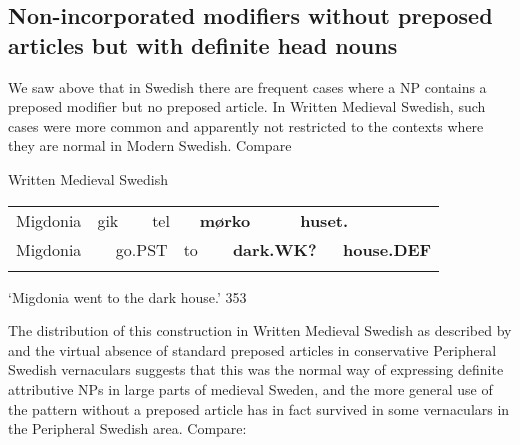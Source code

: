 \subsection{\rmfamily Non-incorporated modifiers without preposed articles but with definite head nouns}
\label{bkm:Ref154984033}
\begin{styleBodyTextFirst}
We saw above that in Swedish there are frequent cases where a NP contains a preposed modifier but no preposed article. In Written Medieval Swedish, such cases were more common and apparently not restricted to the contexts where they are normal in Modern Swedish. Compare 

\end{styleBodyTextFirst}

\begin{listWWNumileveli}
\item 

\begin{styleExample}
Written Medieval Swedish

\end{styleExample}

\end{listWWNumileveli}

\begin{tabular}{llllllllll}
\lsptoprule
Migdonia & \multicolumn{2}{l}{gik

} & \multicolumn{2}{l}{tel

} & \multicolumn{2}{l}{{\bfseries mørko}

} & \multicolumn{2}{l}{{\bfseries huset.}

} & \\
\multicolumn{2}{l}{Migdonia

} & \multicolumn{2}{l}{go.PST

} & \multicolumn{2}{l}{to

} & \multicolumn{2}{l}{{\bfseries dark.WK?}

} & \multicolumn{2}{l}{{\bfseries house.DEF}

}\\
\lspbottomrule
\end{tabular}

\begin{styleTranslation}
‘Migdonia went to the dark house.’ 353

\end{styleTranslation}

\begin{styleBodyTextFirst}
The distribution of this construction in Written Medieval Swedish as described by \citet{Larm1936} and the virtual absence of standard preposed articles in conservative Peripheral Swedish vernaculars suggests that this was the normal way of expressing definite attributive NPs in large parts of medieval Sweden, and the more general use of the pattern without a preposed article has in fact survived in some vernaculars in the Peripheral Swedish area. Compare: 

\end{styleBodyTextFirst}

